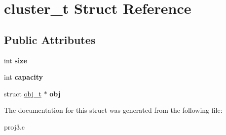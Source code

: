 \hypertarget{structcluster__t}{}\section{cluster\+\_\+t Struct Reference}
\label{structcluster__t}
\subsection*{Public Attributes}
\begin{DoxyCompactItemize}
\item 
\hypertarget{structcluster__t_ae1463905fc36c25032381b8e49359823}{}int {\bfseries size}\label{structcluster__t_ae1463905fc36c25032381b8e49359823}

\item 
\hypertarget{structcluster__t_acee92791a353de443b8a93e1a68e721f}{}int {\bfseries capacity}\label{structcluster__t_acee92791a353de443b8a93e1a68e721f}

\item 
\hypertarget{structcluster__t_a30eaceafae29d1a5b6f0fca36562c473}{}struct \hyperlink{structobj__t}{obj\+\_\+t} $\ast$ {\bfseries obj}\label{structcluster__t_a30eaceafae29d1a5b6f0fca36562c473}

\end{DoxyCompactItemize}


The documentation for this struct was generated from the following file\+:\begin{DoxyCompactItemize}
\item 
proj3.\+c\end{DoxyCompactItemize}
